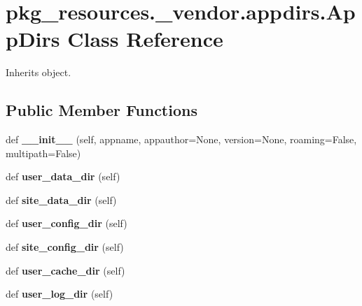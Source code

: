 \hypertarget{classpkg__resources_1_1__vendor_1_1appdirs_1_1_app_dirs}{}\section{pkg\+\_\+resources.\+\_\+vendor.\+appdirs.\+App\+Dirs Class Reference}
\label{classpkg__resources_1_1__vendor_1_1appdirs_1_1_app_dirs}


Inherits object.

\subsection*{Public Member Functions}
\begin{DoxyCompactItemize}
\item 
\mbox{\label{classpkg__resources_1_1__vendor_1_1appdirs_1_1_app_dirs_a0664bb12967adc47ef11d8bae8647479}} 
def {\bfseries \+\_\+\+\_\+init\+\_\+\+\_\+} (self, appname, appauthor=None, version=None, roaming=False, multipath=False)
\item 
\mbox{\label{classpkg__resources_1_1__vendor_1_1appdirs_1_1_app_dirs_adea638267fd19143082c4d6979a8c5db}} 
def {\bfseries user\+\_\+data\+\_\+dir} (self)
\item 
\mbox{\label{classpkg__resources_1_1__vendor_1_1appdirs_1_1_app_dirs_a4bc3634149b8a1ef69b4f35c10d03744}} 
def {\bfseries site\+\_\+data\+\_\+dir} (self)
\item 
\mbox{\label{classpkg__resources_1_1__vendor_1_1appdirs_1_1_app_dirs_afa94999b6d252c7c7975b0aa8b97069d}} 
def {\bfseries user\+\_\+config\+\_\+dir} (self)
\item 
\mbox{\label{classpkg__resources_1_1__vendor_1_1appdirs_1_1_app_dirs_a2973eb14757f6ff1d36b19fef844d5eb}} 
def {\bfseries site\+\_\+config\+\_\+dir} (self)
\item 
\mbox{\label{classpkg__resources_1_1__vendor_1_1appdirs_1_1_app_dirs_a8a6e09aaf39dcfbd48e121d726e9d43e}} 
def {\bfseries user\+\_\+cache\+\_\+dir} (self)
\item 
\mbox{\label{classpkg__resources_1_1__vendor_1_1appdirs_1_1_app_dirs_a0f3f5a4cfae2fe199c1cd9abfd2eabf0}} 
def {\bfseries user\+\_\+log\+\_\+dir} (self)
\end{DoxyCompactItemize}
